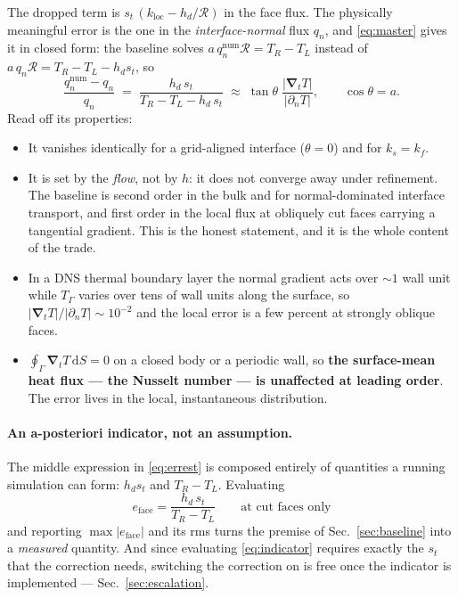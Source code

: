 \documentclass[11pt,a4paper]{article}
\newcommand{\dd}{\mathrm{d}}
\newcommand{\grad}{\boldsymbol{\nabla}}
\newcommand{\Rser}{\mathcal{R}}
\begin{document}
The dropped term is $s_t\,(k_{\text{loc}}-h_d/\Rser)$ in the face flux. The
physically meaningful error is the one in the \emph{interface-normal} flux
$q_n$, and \eqref{eq:master} gives it in closed form: the baseline solves
$a\,q_n^{\text{num}}\Rser=T_R-T_L$ instead of
$a\,q_n\Rser=T_R-T_L-h_d s_t$, so
\begin{equation}
  \boxed{\;
  \frac{q_n^{\text{num}}-q_n}{q_n}
   \;=\; \frac{h_d\,s_t}{T_R-T_L-h_d\,s_t}
   \;\approx\; \tan\theta\;
      \frac{|\grad_tT|}{|\partial_nT|},
  \qquad \cos\theta=a .
  \;}
  \label{eq:errest}
\end{equation}
Read off its properties:
\begin{itemize}
\item It vanishes identically for a grid-aligned interface ($\theta=0$) and for
      $k_s=k_f$.
\item It is set by the \emph{flow}, not by $h$: it does not converge away under
      refinement. The baseline is second order in the bulk and for
      normal-dominated interface transport, and first order in the local flux at
      obliquely cut faces carrying a tangential gradient. This is the honest
      statement, and it is the whole content of the trade.
\item In a DNS thermal boundary layer the normal gradient acts over
      $\sim1$ wall unit while $T_\Gamma$ varies over tens of wall units along
      the surface, so $|\grad_tT|/|\partial_nT|\sim10^{-2}$ and the local error
      is a few percent at strongly oblique faces.
\item $\oint_\Gamma\grad_tT\,\dd S=0$ on a closed body or a periodic wall, so
      \textbf{the surface-mean heat flux --- the Nusselt number --- is
      unaffected at leading order}. The error lives in the local, instantaneous
      distribution.
\end{itemize}

\paragraph{An a-posteriori indicator, not an assumption.}
The middle expression in \eqref{eq:errest} is composed entirely of quantities a
running simulation can form: $h_d s_t$ and $T_R-T_L$. Evaluating
\begin{equation}
  e_{\text{face}} = \frac{h_d\,s_t}{T_R-T_L}
  \qquad\text{at cut faces only}
  \label{eq:indicator}
\end{equation}
and reporting $\max|e_{\text{face}}|$ and its rms turns the premise of
Sec.~\ref{sec:baseline} into a \emph{measured} quantity. And since evaluating
\eqref{eq:indicator} requires exactly the $s_t$ that the correction needs,
switching the correction on is free once the indicator is implemented ---
Sec.~\ref{sec:escalation}.
\end{document}
